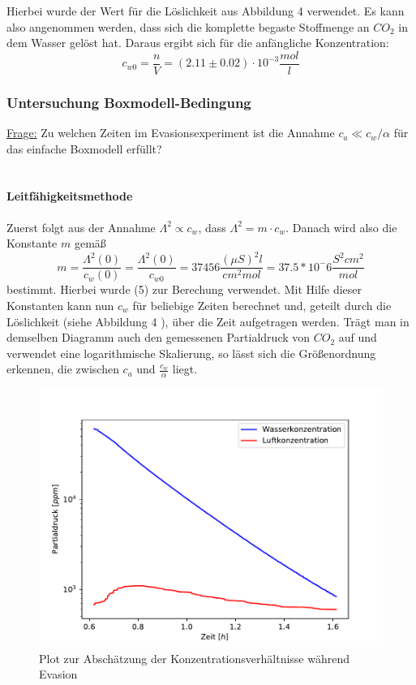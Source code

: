 \documentclass[12pt]{article}
\begin{document}
Hierbei wurde der Wert für die L\"oslichkeit aus Abbildung 4 \cite{jaehne} verwendet. Es kann also angenommen werden, dass sich die komplette begaste Stoffmenge an $CO_2$ in dem Wasser gelöst hat. Daraus ergibt sich für die anfängliche Konzentration:
\begin{equation}
c_{w0} = \frac{n}{V} = (2.11 \pm 0.02)\cdot 10^{-3} \frac{mol}{l}
\end{equation}

\subsubsection{Untersuchung Boxmodell-Bedingung}

\underline{Frage:} Zu welchen Zeiten im Evasionsexperiment ist die Annahme $c_a \ll c_w/\alpha $ für das einfache Boxmodell erfüllt? \\ \\

\paragraph{Leitfähigkeitsmethode\\}

Zuerst folgt aus der Annahme $\Lambda ^2 \propto c_w $, dass $\Lambda ^2 = m \cdot c_w $. Danach wird also die Konstante $m$ gemäß
\begin{equation}
m = \frac{\Lambda^2(0)}{c_w(0)} = \frac{\Lambda^2(0)}{c_{w0}} = 37456 \frac{(\mu S)^2 l}{cm^2 mol} = 37.5 * 10^-6 \frac{S^2 cm^2}{mol}
\end{equation}
bestimmt. Hierbei wurde (5) zur Berechung verwendet. Mit Hilfe dieser Konstanten kann nun $c_w$ für beliebige Zeiten berechnet und, geteilt durch die Löslichkeit (siehe Abbildung 4 \cite{jaehne}), über die Zeit aufgetragen werden. Trägt man in demselben Diagramm auch den gemessenen Partialdruck von $CO_2$ auf und verwendet eine logarithmische Skalierung, so lässt sich die Größenordnung erkennen, die zwischen $c_a$ und $\frac{c_w}{\alpha}$ liegt.

\begin{figure}[H]
	\centering
	\includegraphics[width=120mm]{VE-Wasser/LeitfaehigkeitQuadrat.pdf}
	\caption{Plot zur Abschätzung der Konzentrationsverhältnisse während Evasion}
\end{figure}
\end{document}
